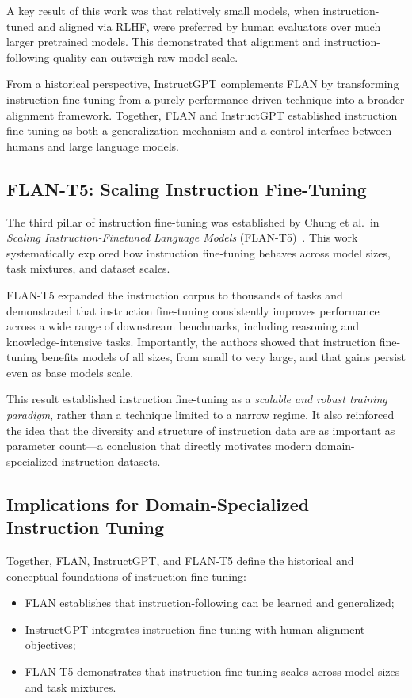 \documentclass[sigconf]{acmart}
\begin{document}
A key result of this work was that relatively small models, when instruction-tuned and aligned via RLHF, were preferred by human evaluators over much larger pretrained models. This demonstrated that alignment and instruction-following quality can outweigh raw model scale.

From a historical perspective, InstructGPT complements FLAN by transforming instruction fine-tuning from a purely performance-driven technique into a broader alignment framework. Together, FLAN and InstructGPT established instruction fine-tuning as both a generalization mechanism and a control interface between humans and large language models.

\subsection{FLAN-T5: Scaling Instruction Fine-Tuning}

The third pillar of instruction fine-tuning was established by Chung et al.\ in \emph{Scaling Instruction-Finetuned Language Models} (FLAN-T5)~\cite{chung2022flant5}. This work systematically explored how instruction fine-tuning behaves across model sizes, task mixtures, and dataset scales.

FLAN-T5 expanded the instruction corpus to thousands of tasks and demonstrated that instruction fine-tuning consistently improves performance across a wide range of downstream benchmarks, including reasoning and knowledge-intensive tasks. Importantly, the authors showed that instruction fine-tuning benefits models of all sizes, from small to very large, and that gains persist even as base models scale.

This result established instruction fine-tuning as a \emph{scalable and robust training paradigm}, rather than a technique limited to a narrow regime. It also reinforced the idea that the diversity and structure of instruction data are as important as parameter count---a conclusion that directly motivates modern domain-specialized instruction datasets.

\subsection{Implications for Domain-Specialized Instruction Tuning}

Together, FLAN, InstructGPT, and FLAN-T5 define the historical and conceptual foundations of instruction fine-tuning:
\begin{itemize}
  \item FLAN establishes that instruction-following can be learned and generalized;
  \item InstructGPT integrates instruction fine-tuning with human alignment objectives;
  \item FLAN-T5 demonstrates that instruction fine-tuning scales across model sizes and task mixtures.
\end{itemize}
\end{document}
